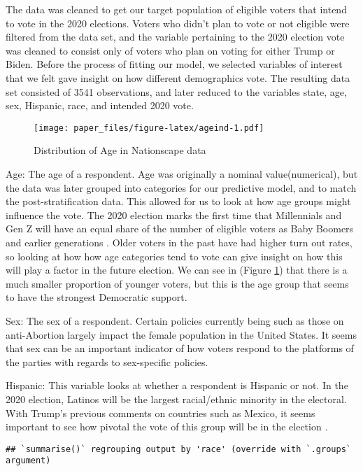 \documentclass[
]{article}
\begin{document}
The data was cleaned to get our target population of eligible voters that intend to vote in the 2020 elections. Voters who didn't plan to vote or not eligible were filtered from the data set, and the variable pertaining to the 2020 election vote was cleaned to consist only of voters who plan on voting for either Trump or Biden. Before the process of fitting our model, we selected variables of interest that we felt gave insight on how different demographics vote. The resulting data set consisted of 3541 observations, and later reduced to the variables state, age, sex, Hispanic, race, and intended 2020 vote.

\begin{figure}
\centering
\texttt{[image: paper\_files/figure-latex/ageind-1.pdf]}
\caption{\label{fig:ageind}Distribution of Age in Nationscape data}
\end{figure}

Age: The age of a respondent. Age was originally a nominal value(numerical), but the data was later grouped into categories for our predictive model, and to match the post-stratification data. This allowed for us to look at how age groups might influence the vote. The 2020 election marks the first time that Millennials and Gen Z will have an equal share of the number of eligible voters as Baby Boomers and earlier generations \cite{@agearticle} . Older voters in the past have had higher turn out rates, so looking at how how age categories tend to vote can give insight on how this will play a factor in the future election. We can see in (Figure \ref{fig:ageind}) that there is a much smaller proportion of younger voters, but this is the age group that seems to have the strongest Democratic support.

Sex: The sex of a respondent. Certain policies currently being such as those on anti-Abortion largely impact the female population in the United States. It seems that sex can be an important indicator of how voters respond to the platforms of the parties with regards to sex-specific policies.

Hispanic: This variable looks at whether a respondent is Hispanic or not. In the 2020 election, Latinos will be the largest racial/ethnic minority in the electoral. With Trump's previous comments on countries such as Mexico, it seems important to see how pivotal the vote of this group will be in the election \cite{@citeBBC}.

\begin{verbatim}
## `summarise()` regrouping output by 'race' (override with `.groups` argument)
\end{verbatim}
\end{document}
